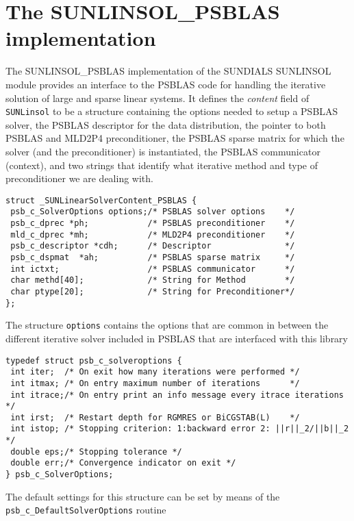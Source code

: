 \documentclass[twoside,a4paper]{refart}
\theoremstyle{definition}
\begin{document}
\section{The SUNLINSOL\_PSBLAS implementation}\label{sec:sunlinsol}
	The SUNLINSOL\_PSBLAS implementation of the SUNDIALS SUNLINSOL module provides an interface to the PSBLAS code for handling the iterative solution of large and sparse linear systems. It defines the \emph{content} field of \texttt{SUNLinsol} to be a structure containing the options needed to setup a PSBLAS solver, the PSBLAS descriptor for the data distribution, the pointer to both PSBLAS and MLD2P4 preconditioner, the PSBLAS sparse matrix for which the solver (and the preconditioner) is instantiated, the PSBLAS communicator (context), and two strings that identify what iterative method and type of preconditioner we are dealing with.
\begin{lstlisting}[style=CStyle]
struct _SUNLinearSolverContent_PSBLAS {
 psb_c_SolverOptions options;/* PSBLAS solver options    */
 psb_c_dprec *ph;            /* PSBLAS preconditioner    */
 mld_c_dprec *mh;            /* MLD2P4 preconditioner    */
 psb_c_descriptor *cdh;      /* Descriptor               */
 psb_c_dspmat  *ah;          /* PSBLAS sparse matrix     */
 int ictxt;                  /* PSBLAS communicator      */
 char methd[40];             /* String for Method        */
 char ptype[20];             /* String for Preconditioner*/
};
\end{lstlisting}

The structure \texttt{options} contains the options that are common in between the different iterative solver included in PSBLAS that are interfaced with this library
\begin{lstlisting}[style=CStyle]
typedef struct psb_c_solveroptions {
 int iter;  /* On exit how many iterations were performed */
 int itmax; /* On entry maximum number of iterations      */
 int itrace;/* On entry print an info message every itrace iterations */
 int irst;  /* Restart depth for RGMRES or BiCGSTAB(L)    */
 int istop; /* Stopping criterion: 1:backward error 2: ||r||_2/||b||_2 */
 double eps;/* Stopping tolerance */
 double err;/* Convergence indicator on exit */
} psb_c_SolverOptions;
\end{lstlisting}
The default settings for this structure can be set by means of the \lstinline[style=CStyle]|psb_c_DefaultSolverOptions| routine
\end{document}
